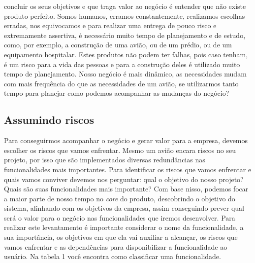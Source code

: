     concluir os seus objetivos e que traga valor ao negócio é entender que não
    existe produto perfeito. Somos humanos, erramos constantemente, realizamos
    escolhas erradas, nos equivocamos e para realizar uma entrega de pouco risco
    e extremamente assertiva, é necessário muito tempo de planejamento e de estudo,
    como, por exemplo, a construção de uma avião, ou de um prédio, ou de um equipamento
    hospitalar. Estes produtos não podem ter falhas, pois caso tenham, é um risco
    para a vida das pessoas e para a construção deles é utilizado muito tempo de
    planejamento. Nosso negócio é mais dinâmico, as necessidades mudam com
    mais frequência do que as necessidades de um avião, se utilizarmos tanto tempo
    para planejar como podemos acompanhar as mudanças do negócio?

    \subsection{Assumindo riscos}
      Para conseguirmos acompanhar o negócio e gerar valor para a empresa, devemos
      escolher os riscos que vamos enfrentar. Mesmo um avião encara riscos no seu
      projeto, por isso que são implementados diversas redundâncias nas funcionalidades
      mais importantes. Para identificar os riscos que vamos enfrentar e quais vamos
      conviver devemos nos perguntar: qual o objetivo do nosso projeto? Quais são
      suas funcionalidades mais importante? \newline
      Com base nisso, podemos focar a maior parte de nosso tempo no \textit{core}
      do produto, descobrindo o objetivo do sistema, alinhando com os objetivos
      da empresa, assim conseguindo prever qual será o valor para o negócio nas
      funcionalidades que iremos desenvolver. Para realizar este levantamento é
      importante considerar o nome da funcionalidade, a sua importância, os objetivos
      em que ela vai auxiliar a alcançar, os riscos que vamos enfrentar e as dependências
      para disponibilizar a funcionalidade ao usuário. Na tabela 1 você encontra
      como classificar uma funcionalidade. \newline


